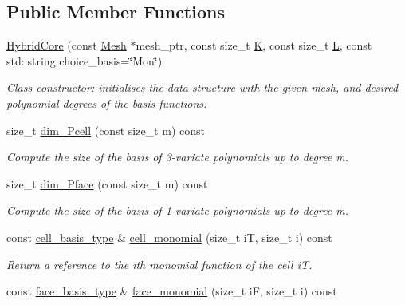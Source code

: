 \subsection*{Public Member Functions}
\begin{DoxyCompactItemize}
\item 
\hyperlink{classHArDCore3D_1_1HybridCore_af4978b5ad1f20f152357e94ffa94bfa9}{Hybrid\+Core} (const \hyperlink{classHArDCore3D_1_1Mesh}{Mesh} $\ast$mesh\+\_\+ptr, const size\+\_\+t \hyperlink{group__HybridCore_ga5c5d20faf615bca6e170961a61464fb2}{K}, const size\+\_\+t \hyperlink{group__HybridCore_gae2bb060c207a888bf97a9d2a9626e1c0}{L}, const std\+::string choice\+\_\+basis=\char`\"{}Mon\char`\"{})
\begin{DoxyCompactList}\small\item\em Class constructor\+: initialises the data structure with the given mesh, and desired polynomial degrees of the basis functions. \end{DoxyCompactList}\item 
size\+\_\+t \hyperlink{classHArDCore3D_1_1HybridCore_aa2bdc59d150566e1b992058031509d2f}{dim\+\_\+\+Pcell} (const size\+\_\+t m) const
\begin{DoxyCompactList}\small\item\em Compute the size of the basis of 3-\/variate polynomials up to degree m. \end{DoxyCompactList}\item 
size\+\_\+t \hyperlink{classHArDCore3D_1_1HybridCore_a52d3a5aa6d681847e90c41d91abb360e}{dim\+\_\+\+Pface} (const size\+\_\+t m) const
\begin{DoxyCompactList}\small\item\em Compute the size of the basis of 1-\/variate polynomials up to degree m. \end{DoxyCompactList}\item 
const \hyperlink{classHArDCore3D_1_1HybridCore_a9e760b418a3948b34114879f37086829}{cell\+\_\+basis\+\_\+type} \& \hyperlink{classHArDCore3D_1_1HybridCore_aa7006921a9e212784abf688f63a855a0}{cell\+\_\+monomial} (size\+\_\+t iT, size\+\_\+t i) const
\begin{DoxyCompactList}\small\item\em Return a reference to the i\textquotesingle{}th monomial function of the cell iT. \end{DoxyCompactList}\item 
const \hyperlink{classHArDCore3D_1_1HybridCore_ae0b0cdad94d3527d0b06e601c091cdad}{face\+\_\+basis\+\_\+type} \& \hyperlink{classHArDCore3D_1_1HybridCore_a4544ebe6193ab5239fdca5381043c031}{face\+\_\+monomial} (size\+\_\+t iF, size\+\_\+t i) const

\end{DoxyCompactItemize}
